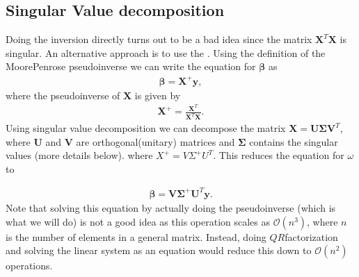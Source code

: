 \documentclass[letterpaper,10pt,english]{sphinxmanual}
\begin{document}
\subsection{Singular Value decomposition}
\label{\detokenize{chapter4:singular-value-decomposition}}
Doing the inversion directly turns out to be a bad idea since the matrix
\(\boldsymbol{X}^T\boldsymbol{X}\) is singular. An alternative approach is to use the . Using the definition of the Moore\sphinxhyphen{}Penrose
pseudoinverse we can write the equation for \(\boldsymbol{\beta}\) as
\begin{equation*}
\begin{split}
\boldsymbol{\beta} = \boldsymbol{X}^{+}\boldsymbol{y},
\end{split}
\end{equation*}
where the pseudoinverse of \(\boldsymbol{X}\) is given by
\begin{equation*}
\begin{split}
\boldsymbol{X}^{+} = \frac{\boldsymbol{X}^T}{\boldsymbol{X}^T\boldsymbol{X}}.
\end{split}
\end{equation*}
Using singular value decomposition we can decompose the matrix  \(\boldsymbol{X} = \boldsymbol{U}\boldsymbol{\Sigma} \boldsymbol{V}^T\),
where \(\boldsymbol{U}\) and \(\boldsymbol{V}\) are orthogonal(unitary) matrices and \(\boldsymbol{\Sigma}\) contains the singular values (more details below).
where \(X^{+} = V\Sigma^{+} U^T\). This reduces the equation for
\(\omega\) to




\begin{equation*}
\begin{split}
\begin{equation}
    \boldsymbol{\beta} = \boldsymbol{V}\boldsymbol{\Sigma}^{+} \boldsymbol{U}^T \boldsymbol{y}.
\label{_auto7} \tag{7}
\end{equation}
\end{split}
\end{equation*}
Note that solving this equation by actually doing the pseudoinverse
(which is what we will do) is not a good idea as this operation scales
as \(\mathcal{O}(n^3)\), where \(n\) is the number of elements in a
general matrix. Instead, doing \(QR\)\sphinxhyphen{}factorization and solving the
linear system as an equation would reduce this down to
\(\mathcal{O}(n^2)\) operations.
\end{document}
